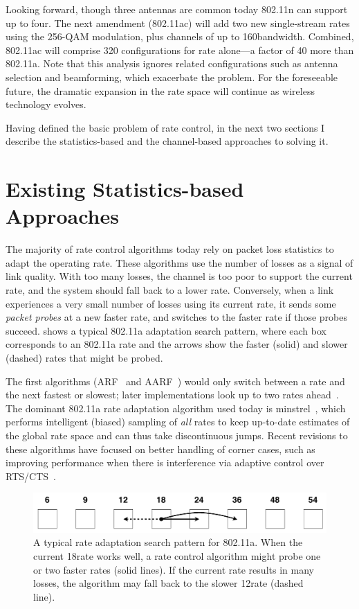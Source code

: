 Looking forward, though three antennas are common today 802.11n can support up to four. The next amendment (802.11ac) will add two new single-stream rates using the 256-QAM modulation, plus channels of up to 160\MHz bandwidth. Combined, 802.11ac will comprise 320 configurations for rate alone---a factor of 40 more than 802.11a. Note that this analysis ignores related configurations such as antenna selection and beamforming, which exacerbate the problem. For the foreseeable future, the dramatic expansion in the rate space will continue as wireless technology evolves.

Having defined the basic problem of rate control, in the next two sections I describe the statistics-based and the channel-based approaches to solving it.

\section{Existing Statistics-based Approaches}
The majority of rate control algorithms today rely on packet loss statistics to adapt the operating rate. These algorithms use the number of losses as a signal of link quality. With too many losses, the channel is too poor to support the current rate, and the system should fall back to a lower rate. Conversely, when a link experiences a very small number of losses using its current rate, it sends some \emph{packet probes} at a new faster rate, and switches to the faster rate if those probes succeed.  shows a typical 802.11a adaptation search pattern, where each box corresponds to an 802.11a rate and the arrows show the faster (solid) and slower (dashed) rates that might be probed.

The first algorithms (ARF~\cite{Kamerman_ARF} and AARF~\cite{Lacage_AARF}) would only switch between a rate and the next fastest or slowest; later implementations look up to two rates ahead~\cite{Bicket_SampleRate}. The dominant 802.11a rate adaptation algorithm used today is minstrel~\cite{minstrel}, which performs intelligent (biased) sampling of \emph{all} rates to keep up-to-date estimates of the global rate space and can thus take discontinuous jumps. Recent revisions to these algorithms have focused on better handling of corner cases, such as improving performance when there is interference via adaptive control over RTS/CTS~\cite{minstrel,Wong_RRAA}.

\begin{figure}[t]
      \centering
      \includegraphics[scale=0.4]{figures/approach/search_11a.pdf}
      \caption[Rate adaptation search pattern for 802.11a]{\label{fig:search_11a}A typical rate adaptation search pattern for 802.11a. When the current 18\Mbps rate works well, a rate control algorithm might probe one or two faster rates (solid lines). If the current rate results in many losses, the algorithm may fall back to the slower 12\Mbps rate (dashed line).}
\end{figure}

